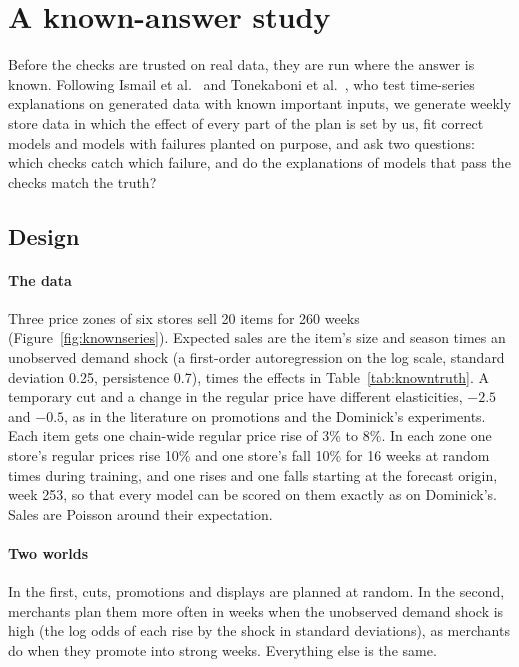 \section{A known-answer study}
\label{sec:known}

Before the checks are trusted on real data, they are run where the answer is
known. Following Ismail et al.~\cite{ismail2020} and Tonekaboni et
al.~\cite{tonekaboni2020}, who test time-series explanations on generated data
with known important inputs, we generate weekly store data in which the effect
of every part of the plan is set by us, fit correct models and models with
failures planted on purpose, and ask two questions: which checks catch which
failure, and do the explanations of models that pass the checks match the
truth?

\subsection{Design}

\paragraph{The data}
Three price zones of six stores sell 20 items for 260 weeks
(Figure~\ref{fig:knownseries}). Expected sales are the item's size and season
times an unobserved demand shock (a first-order autoregression on the log
scale, standard deviation 0.25, persistence 0.7), times the effects in
Table~\ref{tab:knowntruth}. A temporary cut and a change in the regular price
have different elasticities, $-2.5$ and $-0.5$, as in the literature on
promotions and the Dominick's experiments. Each item gets one chain-wide
regular price rise of 3\% to 8\%. In each zone one store's regular prices rise
10\% and one store's fall 10\% for 16 weeks at random times during training,
and one rises and one falls starting at the forecast origin, week 253, so that
every model can be scored on them exactly as on Dominick's. Sales are Poisson
around their expectation.

\paragraph{Two worlds}
In the first, cuts, promotions and displays are planned at random. In the
second, merchants plan them more often in weeks when the unobserved demand
shock is high (the log odds of each rise by the shock in standard deviations),
as merchants do when they promote into strong weeks. Everything else is the
same.

